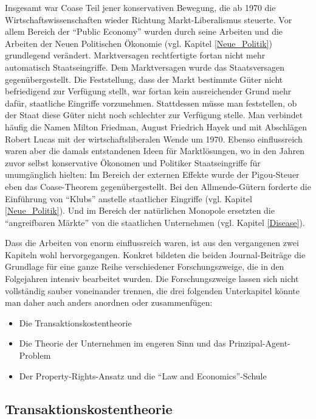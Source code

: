 Insgesamt war Coase Teil jener konservativen Bewegung, die ab 1970 die Wirtschaftswissenschaften wieder Richtung Markt-Liberalismus steuerte. Vor allem  Bereich der "`Public Economy"' wurden durch seine Arbeiten und die Arbeiten der Neuen Politischen Ökonomie (vgl. Kapitel \ref{Neue_Politik}) grundlegend verändert. Marktversagen rechtfertigte fortan nicht mehr automatisch Staatseingriffe. Dem Marktversagen wurde das Staatsversagen gegenübergestellt. Die Feststellung, dass der Markt bestimmte Güter nicht befriedigend zur Verfügung stellt, war fortan kein ausreichender Grund mehr dafür, staatliche Eingriffe vorzunehmen. Stattdessen müsse man feststellen, ob der Staat diese Güter nicht noch schlechter zur Verfügung stelle. Man verbindet häufig die Namen Milton Friedman, August Friedrich Hayek und mit Abschlägen Robert Lucas mit der wirtschaftsliberalen Wende um 1970. Ebenso einflussreich waren aber die damals entstandenen Ideen für Marktlösungen, wo in den Jahren zuvor selbst konservative Ökonomen und Politiker Staatseingriffe für unumgänglich hielten: Im Bereich der externen Effekte wurde der Pigou-Steuer eben das Coase-Theorem gegenübergestellt. Bei den Allmende-Gütern forderte \textcite{Buchanan1965} die Einführung von "`Klubs"' anstelle staatlicher Eingriffe (vgl. Kapitel \ref{Neue_Politik}). Und im Bereich der natürlichen Monopole ersetzten die "`angreifbaren Märkte"' von \textcite{Baumol1982} die staatlichen Unternehmen (vgl. Kapitel \ref{Disease}). 

Dass die Arbeiten von \textcite{Coase1937, Coase1960} enorm einflussreich waren, ist aus den vergangenen zwei Kapiteln wohl hervorgegangen. Konkret bildeten die beiden Journal-Beiträge die Grundlage für eine ganze Reihe verschiedener Forschungszweige, die in den Folgejahren intensiv bearbeitet wurden. Die Forschungszweige lassen sich nicht vollständig sauber voneinander trennen, die drei folgenden Unterkapitel könnte man daher auch anders anordnen oder zusammenfügen:
\begin{itemize}
	\item Die Transaktionskostentheorie
	\item Die Theorie der Unternehmen im engeren Sinn und das Prinzipal-Agent-Problem
	\item Der Property-Rights-Ansatz und die "`Law and Economics"'-Schule
\end{itemize}

\subsection{Transaktionskostentheorie}
\label{sec: Transaktionskosten}

